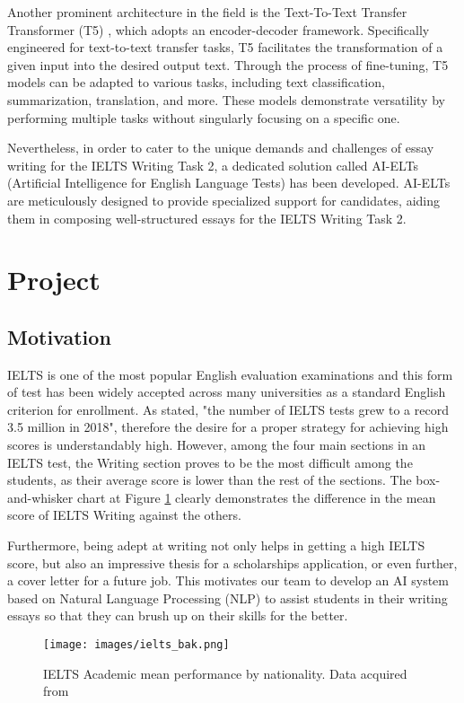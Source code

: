 \documentclass[conference]{IEEEtran}
\begin{document}
Another prominent architecture in the field is the Text-To-Text Transfer Transformer (T5) \cite{t5}, which adopts an encoder-decoder framework. Specifically engineered for text-to-text transfer tasks, T5 facilitates the transformation of a given input into the desired output text. Through the process of fine-tuning, T5 models can be adapted to various tasks, including text classification, summarization, translation, and more. These models demonstrate versatility by performing multiple tasks without singularly focusing on a specific one.

Nevertheless, in order to cater to the unique demands and challenges of essay writing for the IELTS Writing Task 2, a dedicated solution called AI-ELTs (Artificial Intelligence for English Language Tests) has been developed. AI-ELTs are meticulously designed to provide specialized support for candidates, aiding them in composing well-structured essays for the IELTS Writing Task 2.

\section{Project}


\subsection{Motivation}\label{AA}
IELTS is one of the most popular English evaluation examinations and this form of test has been widely accepted across many universities as a standard English criterion for enrollment. As \cite{ielts} stated, "the number of IELTS tests grew to a record 3.5 million in 2018", therefore the desire for a proper strategy for achieving high scores is understandably high. However, among the four main sections in an IELTS test, the Writing section proves to be the most difficult among the students, as their average score is lower than the rest of the sections. The box-and-whisker chart at Figure \ref{fig:ielts_academic} clearly demonstrates the difference in the mean score of IELTS Writing against the others.

Furthermore, being adept at writing not only helps in getting a high IELTS score, but also an impressive thesis for a scholarships application, or even further, a cover letter for a future job. This motivates our team to develop an AI system based on Natural Language Processing (NLP) to assist students in their writing essays so that they can brush up on their skills for the better.
\begin{figure}
  \texttt{[image: images/ielts\_bak.png]}
  \caption{IELTS Academic mean performance by nationality. Data acquired from \cite{ielts_graph}}
  \label{fig:ielts_academic}
\end{figure}
\end{document}
